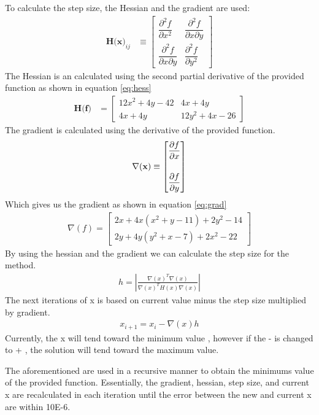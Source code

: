 \documentclass[12pt]{article}
\begin{document}
To calculate the step size, the Hessian and the gradient are used: 
\begin{align}
  \textbf{H(x)}_{ij} &\equiv  
  \begin{bmatrix}
    \dfrac{\partial^2 f}{\partial x^2} & \dfrac{\partial^2 f}{\partial x \partial y} \\[2em]
    \dfrac{\partial^2 f}{\partial x \partial y} & \dfrac{\partial^2 f}{\partial y^2}
  \end{bmatrix}
\end{align}
The Hessian is an  calculated using the second partial derivative of the provided function as shown in equation \ref{eq:hess}
\begin{align}\label{eq:hess}
  \textbf{H(f)} &= 
  \begin{bmatrix}
    12x^2+4y-42 & 4x+4y \\[2em]
    4x+4y & 12y^2+4x-26
  \end{bmatrix}    
\end{align}
The gradient is calculated using the derivative of the provided function.
\begin{align}
\nabla(\textbf x) \equiv 
\begin{bmatrix}
\dfrac{\partial f}{\partial x}\\[2em]
\dfrac{\partial f}{\partial y}
\end{bmatrix}
\end{align}
Which gives us the gradient as shown in equation \ref{eq:grad} 
\begin{align}\label{eq:grad}
\nabla(f) =
\begin{bmatrix}
2x + 4x(x^2 + y - 11) + 2y^2 - 14\\[2em]
2y + 4y(y^2 + x - 7) + 2x^2 - 22
\end{bmatrix}
\end{align}
By using the hessian and the gradient we can calculate the step size for the method.
\begin{align}
    h= \left|  \frac{\nabla(x)^T \nabla(x)}{\nabla(x)^T H(x) \nabla(x)} \right|
\end{align}
The next iterations of x is based on current value minus the step size multiplied by gradient.
\begin{align}
    x_{i+1}=x_i-\nabla(x)h
\end{align}
Currently, the x will tend toward the minimum value , however if the - is changed to  + , the solution will tend toward the maximum value.

The aforementioned are used in a recursive manner to obtain the minimums value of the provided function. Essentially, the gradient, hessian, step size, and current x are recalculated in each iteration until the error between the new and current x are within 10E-6. 
\end{document}
